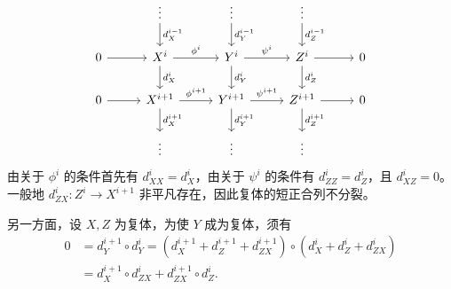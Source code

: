 
\[
\begin{tikzcd}[row sep=1.9em, column sep=2.7em]
& \vdots \arrow[d,"d_X^{i-1}"] & \vdots \arrow[d,"d_Y^{i-1}"] & \vdots \arrow[d,"d_Z^{i-1}"] & \\
0 \arrow[r] & X^i \arrow[r,"\phi^i"] \arrow[d,"d_X^i"] & Y^i \arrow[r,"\psi^i"] \arrow[d,"d_Y^i"] & Z^i \arrow[r] \arrow[d,"d_Z^i"] & 0 \\
0 \arrow[r] & X^{i+1} \arrow[r,"\phi^{i+1}"] \arrow[d,"d_X^{i+1}"] & Y^{i+1} \arrow[r,"\psi^{i+1}"] \arrow[d,"d_Y^{i+1}"] & Z^{i+1} \arrow[r] \arrow[d,"d_Z^{i+1}"] & 0 \\
& \vdots & \vdots & \vdots &
\end{tikzcd}
\]
由关于 $\phi^i$ 的条件首先有 $d_{XX}^i=d_X^i$，由关于 $\psi^i$ 的条件有 $d_{ZZ}^i=d_Z^i$，且 $d_{XZ}^i=0$。一般地 $d_{ZX}^i\colon Z^i\to X^{i+1}$ 非平凡存在，因此复体的短正合列不分裂。

另一方面，设 $X,Z$ 为复体，为使 $Y$ 成为复体，须有
\begin{equation}
\begin{aligned}
0&=d_Y^{i+1}\circ d_Y^i=(d_X^{i+1}+d_Z^{i+1}+d_{ZX}^{i+1})\circ(d_X^i+d_Z^i+d_{ZX}^i)\\
&=d_X^{i+1}\circ d_{ZX}^i+d_{ZX}^{i+1}\circ d_Z^i.
\end{aligned} \tag{3.11}
\end{equation}



